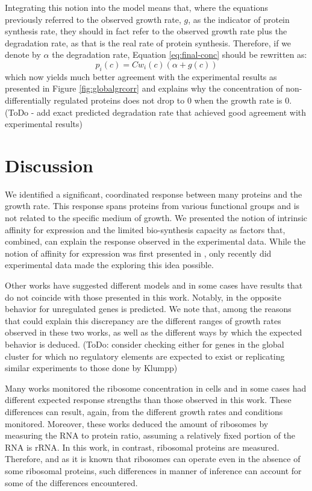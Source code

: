 \documentclass[notitlepage]{article}
\begin{document}
Integrating this notion into the model means that, where the equations previously referred to the observed growth rate, $g$, as the indicator of protein synthesis rate, they should in fact refer to the observed growth rate plus the degradation rate, as that is the real rate of protein synthesis.
Therefore, if we denote by $\alpha$ the degradation rate, Equation \ref{eq:final-conc} should be rewritten as:
\begin{equation}
  \label{eq:final-conc-deg}
  p_i(c)=Cw_i(c)(\alpha+g(c))
\end{equation}
which now yields much better agreement with the experimental results as presented in Figure \ref{fig:globalgrcorr} and explains why the concentration of non-differentially regulated proteins does not drop to 0 when the growth rate is 0.
(ToDo - add exact predicted degradation rate that achieved good agreement with experimental results)
\section{Discussion}
We identified a significant, coordinated response between many proteins and the growth rate.
This response spans proteins from various functional groups and is not related to the specific medium of growth.
We presented the notion of intrinsic affinity for expression and the limited bio-synthesis capacity as factors that, combined, can explain the response observed in the experimental data.
While the notion of affinity for expression was first presented in \parencite{Maaloe1969}, only recently did experimental data made the exploring this idea possible.

Other works have suggested different models and in some cases have results that do not coincide with those presented in this work.
Notably, in \parencite{Klumpp2009a} the opposite behavior for unregulated genes is predicted.
We note that, among the reasons that could explain this discrepancy are the different ranges of growth rates observed in these two works, as well as the different ways by which the expected behavior is deduced.
(ToDo: consider checking either for genes in the global cluster for which no regulatory elements are expected to exist or replicating similar experiments to those done by Klumpp)

Many works monitored the ribosome concentration in cells \parencite{Scott2010, Bremer1987, Schaechter1958, 1974, eco-sal} and in some cases had different expected response strengths than those observed in this work.
These differences can result, again, from the different growth rates and conditions monitored.
Moreover, these works deduced the amount of ribosomes by measuring the RNA to protein ratio, assuming a relatively fixed portion of the RNA is rRNA.
In this work, in contrast, ribosomal proteins are measured.
Therefore, and as it is known that ribosomes can operate even in the absence of some ribosomal proteins, such differences in manner of inference can account for some of the differences encountered.
\end{document}
